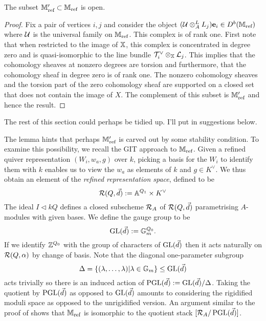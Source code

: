 \documentclass[12pt]{amsart}
\begin{document}
\begin{lemma}\label{lm:open}
The subset $\mathbb{M}_{\text{ref}}' \subset \mathbb{M}_{\text{ref}}$ is open.
\end{lemma}

\begin{proof}
Fix a pair of vertices $i,j$ and consider the object $(\mathcal{U} \otimes^L_A L_j)\mathbf{e}_i \in D^b(\mathbb{M}_\text{ref})$ where $\mathcal{U}$ is the universal family on  $\mathbb{M}_{\text{ref}}$. This complex is of rank one.
First note that when restricted to the image of $\mathbb{X}$, this complex is concentrated in degree zero and is quasi-isomorphic to the line bundle $\mathcal{T}_i^{\vee} \otimes_{\mathbb{X}} \mathcal{L}_j$. This implies that the cohomology sheaves at nonzero degrees are torsion and furthermore, that the cohomology sheaf in degree zero is of rank one.
The nonzero cohomology sheaves and the torsion part of the zero cohomology sheaf are supported on a closed set that does not contain the image of $X$. The complement of this subset is $\mathbb{M}_{\text{ref}}'$ and hence the result.
\end{proof}

{\red The rest of this section could perhaps be tidied up. I'll put in suggestions below.}

The lemma hints that perhaps $\mathbb{M}'_{\textup{ref}}$ is carved out by some stability condition. To examine this possibility, we recall the GIT approach to $\mathbb{M}_{\textup{ref}}$. 
Given a refined quiver representation $(W_i, w_a, g)$ over $k$, picking a basis for the $W_i$ to identify them with $k$ enables us to view the $w_a$ as elements of $k$ and $g\in K^{\vee}$. We thus obtain an element of the {\em refined representation space}, defined  to be \begin{equation*}
\mathcal{R}(Q, \vec{d}) := \mathbb{A}^{Q_1} \times K^{\vee} \end{equation*}
The ideal $I \triangleleft kQ$ defines a closed subscheme $\mathcal{R}_A$ of $\mathcal{R}(Q,\vec{d})$ parametrising $A$-modules with given bases. We define the gauge group to be
\begin{equation*}
\operatorname{GL}(\vec{d}) := \mathbb{G}_m^{Q_0}.
\end{equation*}
If we identify $\mathbb{Z}^{Q_0}$ with the group of characters of $\operatorname{GL}(\vec{d})$ then it acts naturally on $\mathcal{R}(Q, \alpha)$ by change of basis.
Note that the diagonal one-parameter subgroup 
$$\Delta = \{(\lambda, \ldots,\lambda) | \lambda \in \mathbb{G}_m\} \leq \operatorname{GL}(\vec{d})$$ 
acts trivially so there is an induced action of $\operatorname{PGL}(\vec{d}) := \operatorname{GL}(\vec{d}) / \Delta$.
Taking the quotient by $\operatorname{PGL}(\vec{d})$ as opposed to $\operatorname{GL}(\vec{d})$ amounts to considering the rigidified moduli space as opposed to the unrigidified version. An argument similar to the proof of \cite[Proposition 3.9]{Abd} shows that $\mathbb{M}_{\text{ref}}$ is isomorphic to the quotient stack $[\mathcal{R}_A/ \operatorname{PGL}(\vec{d})]$.
\end{document}
